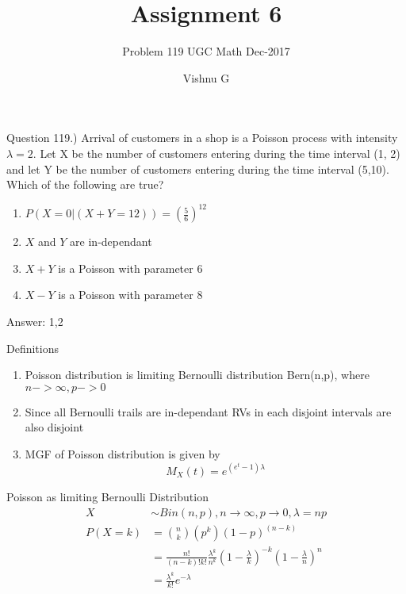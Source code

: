 \documentclass[10pt]{beamer}
\title{Assignment 6}
\subtitle{Problem 119 UGC Math Dec-2017}
\date{}
\author{Vishnu G}
\institute{Indian Institute of Technology Hyderabad}
\begin{document}
\maketitle

\begin{frame}[fragile]{Question}
119.) Arrival of customers in a shop is a Poisson
process with intensity $\lambda = 2$. Let X be the number of customers entering during the time interval (1, 2) and let Y be the number of customers entering during the time interval (5,10). Which of the following are true? \\
\begin{enumerate}
    \item $P(X = 0 | (X+Y=12)) = ({\frac{5}{6}})^{12}$\\
    \item $X$ and $Y$ are in-dependant\\
    \item $X+Y$ is a Poisson with parameter 6\\
    \item $X-Y$ is a Poisson with parameter 8
\end{enumerate}

Answer: 1,2
\end{frame}
\begin{frame}{Definitions}
\begin{enumerate}
\item Poisson distribution is limiting Bernoulli distribution Bern(n,p), where $n -> \infty, p->0$
\item Since all Bernoulli trails are in-dependant RVs in each disjoint intervals are also disjoint
\item MGF of Poisson distribution is given by 
\begin{equation}
    M_{X}(t) = e^{(e^t-1)\lambda}
\end{equation}
\end{enumerate}

\end{frame}

\begin{frame}{Poisson as limiting Bernoulli Distribution }
\begin{align*}
    X &\sim{Bin(n,p)}, n \to \infty, p \to 0, \lambda = np\\
    P(X=k) &= \binom nk (p^k)(1-p)^{(n-k)} \\
           &= \frac{n!}{(n-k)! k!} \frac{\lambda^k}{n^k} (1 - \frac{\lambda}{k})^{-k} (1 - \frac{\lambda}{n})^n \\
           &= \frac{\lambda^k}{k!} e^{-\lambda}
\end{align*}
\end{frame}
\end{document}
